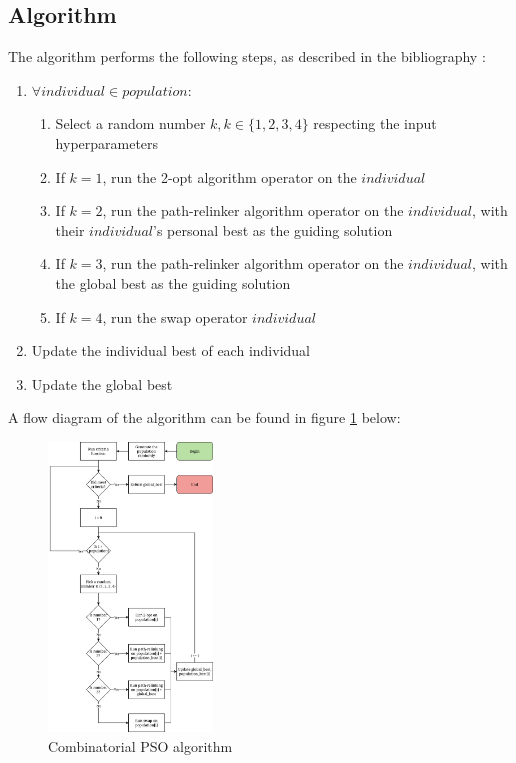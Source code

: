 \documentclass[conference]{IEEEtran}
\begin{document}
\subsection{Algorithm}
The algorithm performs the following steps, as described in the bibliography \cite{b8}:
\begin{enumerate}
    \item $\forall individual \in population$:
    \begin{enumerate}
        \item Select a random number $k, k \in \{1, 2, 3, 4\}$ respecting the input hyperparameters
        \item If $k = 1$, run the 2-opt algorithm operator on the $individual$
        \item If $k = 2$, run the path-relinker algorithm operator on the $individual$, with their $individual$'s personal best as the guiding solution
        \item If $k = 3$, run the path-relinker algorithm operator on the $individual$, with the global best as the guiding solution
        \item If $k = 4$, run the swap operator $individual$
    \end{enumerate}
    \item Update the individual best of each individual
    \item Update the global best
\end{enumerate}

A flow diagram of the algorithm can be found in figure \ref{Combinatorial PSO algorithm} below:

\begin{figure}[h]
    \centering
    \includegraphics[width=0.39\textwidth]{images/pso.png}
    \caption{Combinatorial PSO algorithm} \label{Combinatorial PSO algorithm}
\end{figure}
\end{document}

